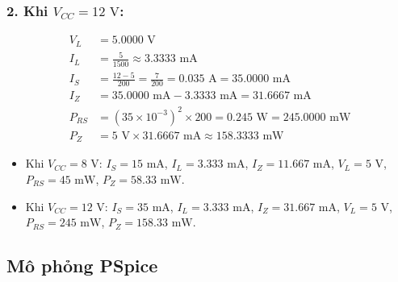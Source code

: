\subsubsection*{2. Khi $V_{CC} = 12\text{ V}$:}
\begin{align*}
  V_L &= 5.0000\text{ V} \\
  I_L &= \frac{5}{1500} \approx 3.3333\text{ mA} \\
  I_S &= \frac{12 - 5}{200} = \frac{7}{200} = 0.035\text{ A} = 35.0000\text{ mA} \\
  I_Z &= 35.0000\text{ mA} - 3.3333\text{ mA} = 31.6667\text{ mA} \\
  P_{RS} &= (35 \times 10^{-3})^2 \times 200 = 0.245\text{ W} = 245.0000\text{ mW} \\
  P_Z &= 5\text{ V} \times 31.6667\text{ mA} \approx 158.3333\text{ mW}
\end{align*}

\begin{dapsobox}
  \begin{itemize}[leftmargin=1.5em]
    \item Khi $V_{CC} = 8\text{ V}$: $I_S = 15\text{ mA}$, $I_L = 3.333\text{ mA}$, $I_Z = 11.667\text{ mA}$, $V_L = 5\text{ V}$, $P_{RS} = 45\text{ mW}$, $P_Z = 58.33\text{ mW}$.
    \item Khi $V_{CC} = 12\text{ V}$: $I_S = 35\text{ mA}$, $I_L = 3.333\text{ mA}$, $I_Z = 31.667\text{ mA}$, $V_L = 5\text{ V}$, $P_{RS} = 245\text{ mW}$, $P_Z = 158.33\text{ mW}$.
  \end{itemize}
\end{dapsobox}

\Needspace{0.66\textheight}
\subsection{Mô phỏng PSpice}
\simresult
{}

